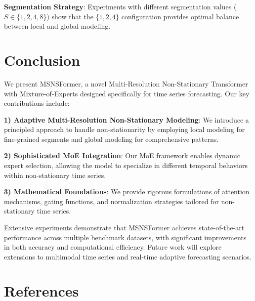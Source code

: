 \documentclass{article}
\begin{document}
\textbf{Segmentation Strategy}: Experiments with different segmentation values ($S \in \{1, 2, 4, 8\}$) show that the $\{1, 2, 4\}$ configuration provides optimal balance between local and global modeling.

\section{Conclusion}
\label{sec:conclusion}

We present MSNSFormer, a novel Multi-Resolution Non-Stationary Transformer with Mixture-of-Experts designed specifically for time series forecasting. Our key contributions include:

\textbf{1) Adaptive Multi-Resolution Non-Stationary Modeling}: We introduce a principled approach to handle non-stationarity by employing local modeling for fine-grained segments and global modeling for comprehensive patterns.

\textbf{2) Sophisticated MoE Integration}: Our MoE framework enables dynamic expert selection, allowing the model to specialize in different temporal behaviors within non-stationary time series.

\textbf{3) Mathematical Foundations}: We provide rigorous formulations of attention mechanisms, gating functions, and normalization strategies tailored for non-stationary time series.

Extensive experiments demonstrate that MSNSFormer achieves state-of-the-art performance across multiple benchmark datasets, with significant improvements in both accuracy and computational efficiency. Future work will explore extensions to multimodal time series and real-time adaptive forecasting scenarios.

\vfill\pagebreak

\section{References}
\label{sec:refs}



\end{document}
